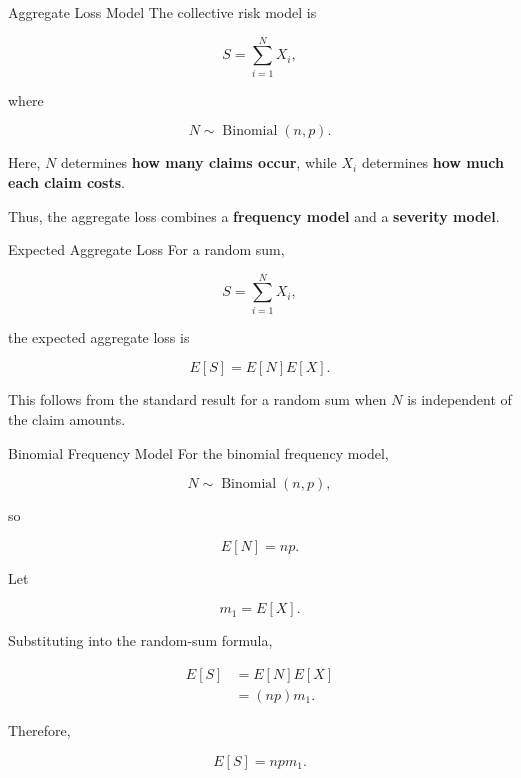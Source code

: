 \documentclass[
  ignorenonframetext,
  aspectratio=169,
]{beamer}
\begin{document}
\begin{frame}{Aggregate Loss Model}
\protect{}\label{aggregate-loss-model}
The collective risk model is

\[
S=\sum_{i=1}^{N}X_i,
\]

where

\[
N\sim\operatorname{Binomial}(n,p).
\]

Here, \(N\) determines \textbf{how many claims occur}, while \(X_i\)
determines \textbf{how much each claim costs}.

Thus, the aggregate loss combines a \textbf{frequency model} and a
\textbf{severity model}.
\end{frame}

\begin{frame}{Expected Aggregate Loss}
\protect{}\label{expected-aggregate-loss}
For a random sum,

\[
S=\sum_{i=1}^{N}X_i,
\]

the expected aggregate loss is

\[
\boxed{E[S]=E[N]E[X]}.
\]

This follows from the standard result for a random sum when \(N\) is
independent of the claim amounts.
\end{frame}

\begin{frame}{Binomial Frequency Model}
\protect{}\label{binomial-frequency-model}
For the binomial frequency model,

\[
N\sim\operatorname{Binomial}(n,p),
\]

so

\[
E[N]=np.
\]

Let

\[
m_1=E[X].
\]

Substituting into the random-sum formula,

\[
\begin{aligned}
E[S]
&=E[N]E[X]\\
&=(np)m_1.
\end{aligned}
\]

Therefore,

\[
\boxed{E[S]=npm_1}.
\]
\end{frame}
\end{document}
